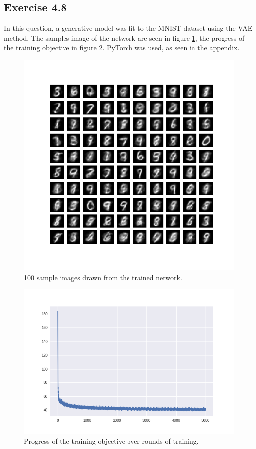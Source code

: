 \documentclass[fleqn]{article}
\begin{document}
\subsection*{Exercise 4.8}
In this question, a generative model was fit to the MNIST dataset using the VAE method. The samples image of the network are seen in figure \ref{fig:mnist2}, the progress of the training objective in figure \ref{fig:vae_loss}. PyTorch was used, as seen in the appendix.
\begin{figure}[H]
    \centering
    \includegraphics[width=5.5in]{vae_samples.png}
    \caption{100 sample images drawn from the trained network.}
    \label{fig:mnist2}
\end{figure}
\begin{figure}[H]
    \centering
    \includegraphics[width=5in]{vae_loss.png}
    \caption{Progress of the training objective over rounds of training.}
    \label{fig:vae_loss}
\end{figure}
\end{document}
